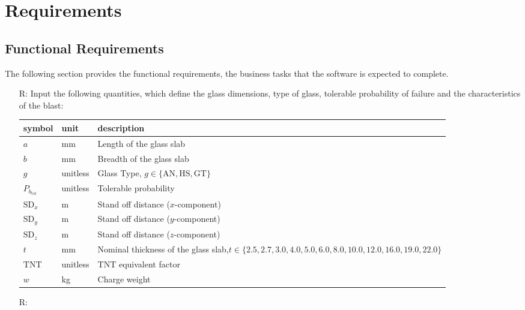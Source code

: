 \documentclass[12pt]{article}
\newcounter{reqnum} %
\begin{document}
\section{Requirements}  
  
\subsection{Functional Requirements} \label{Func}

The following section provides the functional requirements, the business tasks
that the software is expected to complete.

\noindent \begin{itemize}

\item[R\refstepcounter{reqnum}\thereqnum \label{Input}:] Input the following
  quantities, which define the glass dimensions, type of glass, tolerable probability of
  failure and the characteristics of the blast:

\renewcommand{\arraystretch}{1.2}
\begin{tabular}{l l p{11cm}} 
\toprule
\textbf{symbol} & \textbf{unit} & \textbf{description}\\
\midrule 
$a$ & \si{\milli\metre}	& Length of the glass slab\\
$b$ & \si{\milli\metre}	& Breadth of the glass slab\\
$g$ & unitless & Glass Type, $g \in \{ \text{AN}, \text{HS}, \text{GT} \}$\\
$P_{b_{\text{tol}}}$ & unitless & Tolerable probability\\
$\text{SD}_x$ & \si{\meter} & Stand off distance ($x$-component)\\
$\text{SD}_y$ & \si{\metre} & Stand off distance ($y$-component)\\
$\text{SD}_z$ & \si{\metre} & Stand off distance ($z$-component)\\
$t$ & \si{\milli\metre}	& Nominal thickness of the glass slab,\newline $t \in
                                  \{2.5, 2.7, 3.0, 4.0, 5.0, 6.0, 8.0, 10.0,
                                  12.0, 16.0, 19.0, 22.0\}$ \\
$\text{TNT}$ & unitless & TNT equivalent factor\\
$w$ & \si{\kilo\gram}	& Charge weight\\
\bottomrule
\end{tabular}

\item [R\refstepcounter{reqnum}\thereqnum \label{KnownValues}:]


\end{itemize}
\end{document}
